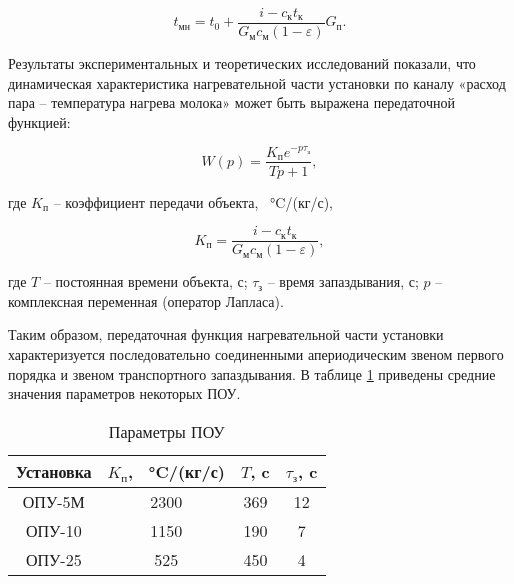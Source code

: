 \begin{equation}
    t_\text{мн} = t_0 + \frac{i - c_\text{к} t_\text{к}}{G_\text{м} c_\text{м}(1 - \varepsilon)} G_\text{п}.
\end{equation}

Результаты экспериментальных и теоретических исследований показали, что динамическая характеристика нагревательной части установки по каналу «расход пара – температура нагрева молока» может быть выражена передаточной функцией:

\begin{equation}\label{steam_temp_relation}
    W(p) = \frac{K_\text{п} e^{-p \tau_\text{з}}} {Tp + 1},
\end{equation}

где $K_\text{п}$ – коэффициент передачи объекта, \SI{}{\celsius}/(кг/с),

\begin{equation}
    K_\text{п} = \frac{i - c_\text{к} t_\text{к}}{G_\text{м} c_\text{м}(1 - \varepsilon)},
\end{equation}

где $T$ – постоянная времени объекта, с; $\tau_\text{з}$ – время запаздывания, с; $p$ – комплексная переменная (оператор Лапласа).

Таким образом, передаточная функция нагревательной части установки характеризуется последовательно соединенными апериодическим звеном первого порядка и звеном транспортного запаздывания. В таблице \ref{table:pasterizer_params} приведены средние значения параметров некоторых ПОУ.

\begin{table} [H]
    \small
    \caption{Параметры ПОУ}\label{table:pasterizer_params}
    \centering
    \begin{tabular}{ | c | c | c | c | }
        \hline
        \textbf{Установка} & $K_\text{п}$, \SI{}{\celsius}/(кг/с) & $T$, c & $\tau_\text{з}$, c \\
        \hline
        ОПУ-5М             & 2300                                 & 369    & 12                 \\
        \hline
        ОПУ-10             & 1150                                 & 190    & 7                  \\
        \hline
        ОПУ-25             & 525                                  & 450    & 4                  \\
        \hline
    \end{tabular}
\end{table}

